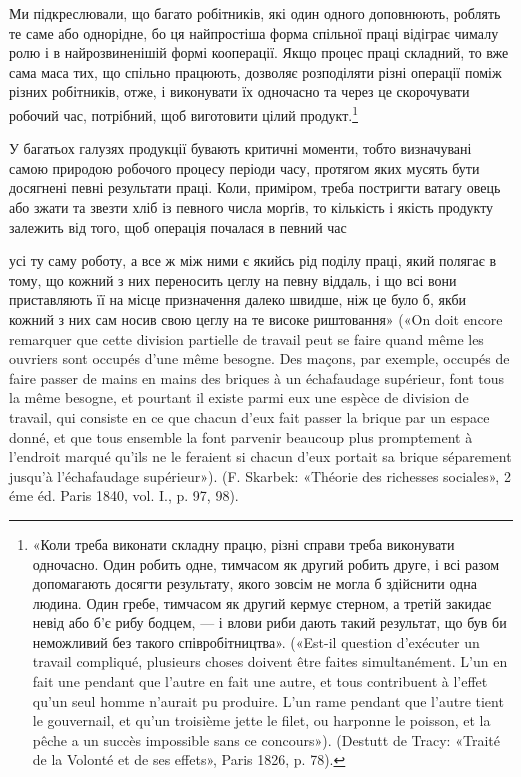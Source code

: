 Ми підкреслювали, що багато робітників, які один одного
доповнюють, роблять те саме або однорідне, бо ця найпростіша
форма спільної праці відіграє чималу ролю і в найрозвиненішій
формі кооперації. Якщо процес праці складний, то вже сама
маса тих, що спільно працюють, дозволяє розподіляти різні
операції поміж різних робітників, отже, і виконувати їх одночасно
та через це скорочувати робочий час, потрібний, щоб виготовити
цілий продукт.\footnote{
«Коли треба виконати складну працю, різні справи треба виконувати
одночасно. Один робить одне, тимчасом як другий робить друге,
і всі разом допомагають досягти результату, якого зовсім не могла б здійснити
одна людина. Один гребе, тимчасом як другий кермує стерном, а
третій закидає невід або б'є рибу бодцем, — і влови риби дають такий
результат, що був би неможливий без такого співробітництва». («Est-il
question d’exécuter un travail compliqué, plusieurs choses doivent être
faites simultanément. L’un en fait une pendant que l’autre en fait une
autre, et tous contribuent à l’effet qu’un seul homme n'aurait pu produire.
L’un rame pendant que l’autre tient le gouvernail, et qu’un troisième jette
le filet, ou harponne le poisson, et la pêche a un succès impossible sans
ce concours»). (Destutt de Tracy: «Traité de la Volonté et de ses effets»,
Paris 1826, p. 78).
}

У багатьох галузях продукції бувають критичні моменти,
тобто визначувані самою природою робочого процесу періоди
часу, протягом яких мусять бути досягнені певні результати
праці. Коли, приміром, треба постригти ватагу овець або зжати
та звезти хліб із певного числа морґів, то кількість і якість продукту
залежить від того, щоб операція почалася в певний час

усі ту саму роботу, а все ж між ними є якийсь рід поділу праці, який полягає
в тому, що кожний з них переносить цеглу на певну віддаль, і що всі
вони приставляють її на місце призначення далеко швидше, ніж це було б,
якби кожний з них сам носив свою цеглу на те високе риштовання»
(«On doit encore remarquer que cette division partielle de travail peut se
faire quand même les ouvriers sont occupés d’une même besogne. Des maçons,
par exemple, occupés de faire passer de mains en mains des briques à un
échafaudage supérieur, font tous la même besogne, et pourtant il existe
parmi eux une espèce de division de travail, qui consiste en ce que chacun
d’eux fait passer la brique par un espace donné, et que tous ensemble la
font parvenir beaucoup plus promptement à l’endroit marqué qu’ils ne le
feraient si chacun d’eux portait sa brique séparement jusqu’à l’échafaudage
supérieur»). (F. Skarbek: «Théorie des richesses sociales», 2 éme éd.
Paris 1840, vol. I., p. 97, 98).
\parbreak{}  %
